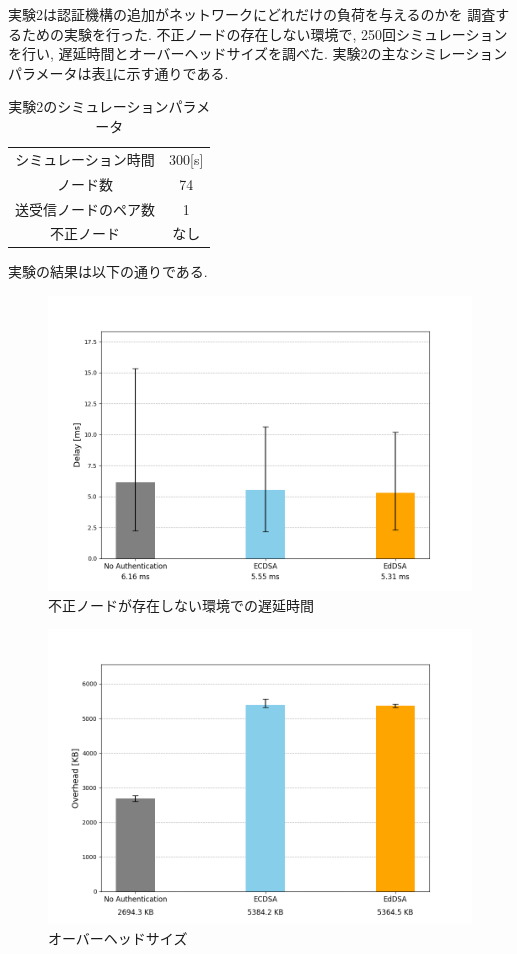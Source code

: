 実験2は認証機構の追加がネットワークにどれだけの負荷を与えるのかを
調査するための実験を行った. 
不正ノードの存在しない環境で, 250回シミュレーションを行い, 
遅延時間とオーバーヘッドサイズを調べた. 
実験2の主なシミレーションパラメータは表\ref{tab:exp2-params}に示す通りである. 
\begin{longtable}{cc}
  \caption{実験2のシミュレーションパラメータ}
  \label{tab:exp2-params}
  \endfirsthead
  \hline
  シミュレーション時間 & 300[s] \\
  ノード数 & 74 \\
  送受信ノードのペア数 & 1 \\ 
  不正ノード & なし \\ \hline
\end{longtable}
\indent 実験の結果は以下の通りである. \\
\begin{figure}
  \centering
  \includegraphics[width=1\textwidth]{figures/exp2_delay.png}
  \caption{不正ノードが存在しない環境での遅延時間}
  \label{fig:exp2_delay}
\end{figure}
\begin{figure}
  \centering
  \includegraphics[width=1\textwidth]{figures/exp2_overhead.png}
  \caption{オーバーヘッドサイズ}
  \label{fig:exp2_overhead}
\end{figure}
